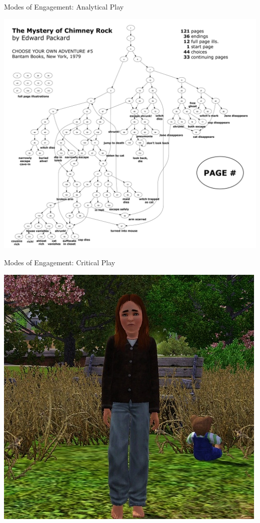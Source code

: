 \documentclass[xcolor=x11names]{beamer}
\begin{document}
\begin{frame}{Modes of Engagement: Analytical Play}
  \begin{center}
    \includegraphics[height=0.8\textheight]{res/chimneyrock.png}
  \end{center}
\end{frame}

\begin{frame}{Modes of Engagement: Critical Play}
  \begin{center}
    \includegraphics[height=0.8\textheight]{res/alice-in-park.jpg}
  \end{center}
\end{frame}
\end{document}
